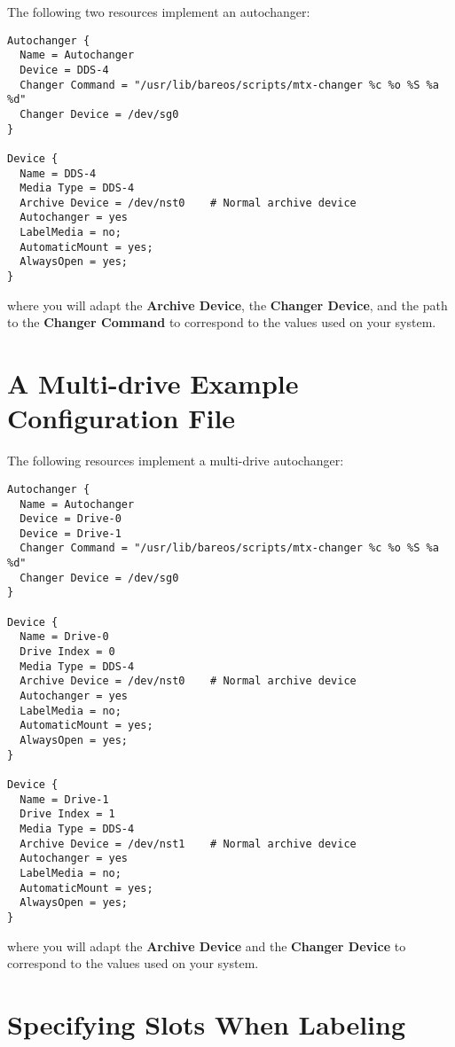 The following two resources implement an autochanger:

\footnotesize
\begin{verbatim}
Autochanger {
  Name = Autochanger
  Device = DDS-4
  Changer Command = "/usr/lib/bareos/scripts/mtx-changer %c %o %S %a %d"
  Changer Device = /dev/sg0
}

Device {
  Name = DDS-4
  Media Type = DDS-4
  Archive Device = /dev/nst0    # Normal archive device
  Autochanger = yes
  LabelMedia = no;
  AutomaticMount = yes;
  AlwaysOpen = yes;
}
\end{verbatim}
\normalsize

where you will adapt the {\bf Archive Device}, the {\bf Changer Device}, and
the path to the {\bf Changer Command} to correspond to the values used on your
system.

\section{A Multi-drive Example Configuration File}

The following resources implement a multi-drive autochanger:

\footnotesize
\begin{verbatim}
Autochanger {
  Name = Autochanger
  Device = Drive-0
  Device = Drive-1
  Changer Command = "/usr/lib/bareos/scripts/mtx-changer %c %o %S %a %d"
  Changer Device = /dev/sg0
}

Device {
  Name = Drive-0
  Drive Index = 0
  Media Type = DDS-4
  Archive Device = /dev/nst0    # Normal archive device
  Autochanger = yes
  LabelMedia = no;
  AutomaticMount = yes;
  AlwaysOpen = yes;
}

Device {
  Name = Drive-1
  Drive Index = 1
  Media Type = DDS-4
  Archive Device = /dev/nst1    # Normal archive device
  Autochanger = yes
  LabelMedia = no;
  AutomaticMount = yes;
  AlwaysOpen = yes;
}
\end{verbatim}
\normalsize

where you will adapt the {\bf Archive Device} and the {\bf Changer Device} to correspond to the values used on your
system.


\section{Specifying Slots When Labeling}
\label{SpecifyingSlots}

